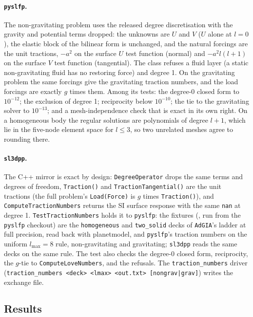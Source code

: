 \documentclass[11pt]{article}
\numberwithin{equation}{section}
\newcommand{\code}[1]{\texttt{#1}}
\begin{document}
\paragraph{\code{pyslfp}.} The non-gravitating problem uses the released
degree discretisation with the gravity and potential terms dropped: the
unknowns are $U$ and $V$ ($U$ alone at $l=0$), the elastic block of the
bilinear form is unchanged, and the natural forcings are the unit tractions,
$-a^2$ on the surface $U$ test function (normal) and $-a^2l(l+1)$ on the
surface $V$ test function (tangential). The class refuses a fluid layer
(a static non-gravitating fluid has no restoring force) and degree 1. On
the gravitating problem the same forcings give the gravitating traction
numbers, and the load forcings are exactly $g$ times them. Among
its tests: the degree-0 closed form to $10^{-12}$; the exclusion of
degree 1; reciprocity below $10^{-10}$; the tie to the gravitating solver to
$10^{-13}$; and a mesh-independence check that is exact in its own right. On
a homogeneous body the regular solutions are polynomials of degree $l+1$,
which lie in the five-node element space for $l\le3$, so two unrelated
meshes agree to rounding there.

\paragraph{\code{sl3dpp}.} The C++ mirror is exact by design:
\code{DegreeOperator} drops the same terms and degrees of freedom,
\code{Traction()} and \code{TractionTangential()} are the unit tractions
(the full problem's \code{Load(Force)} is $g$ times \code{Traction()}),
and \code{ComputeTractionNumbers} returns the SI surface response with the
same \code{nan} at degree 1. \code{TestTractionNumbers} holds it to
\code{pyslfp}: the fixtures (, run from the
\code{pyslfp} checkout) are the \code{homogeneous} and \code{two\_solid}
decks of \code{AdGIA}'s ladder at full precision, read back with
planetmodel, and \code{pyslfp}'s traction numbers on the uniform
$l_{\max}=8$ rule, non-gravitating and gravitating; \code{sl3dpp} reads the
same decks on the same rule. The test also checks the degree-0 closed form,
reciprocity, the $g$-tie to \code{ComputeLoveNumbers}, and the refusals.
The \code{traction\_numbers} driver (\code{traction\_numbers <deck> <lmax>
<out.txt> [nongrav|grav]}) writes the exchange file.

\subsection{Results}
\label{sec:e1-results}
\end{document}

